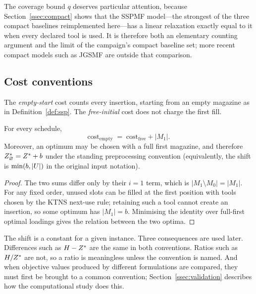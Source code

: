 The coverage bound $q$ deserves particular attention, because
Section~\ref{ssec:compact} shows that the SSPMF model---the strongest of the three
compact baselines reimplemented here---has a linear relaxation exactly equal to it
when every declared tool is used. It is therefore both an elementary counting
argument and the limit of the campaign's compact baseline set; more recent compact
models such as JGSMF \citep{Akhundov2024} are outside that comparison.

\subsection{Cost conventions}\label{ssec:conv}

\begin{definition}\label{def:conv}
The \emph{empty-start} cost counts every insertion, starting from an empty magazine
as in Definition~\ref{def:ssp}. The \emph{free-initial} cost does not charge the
first fill.
\end{definition}

\begin{proposition}\label{prop:conv}
For every schedule,
\[
  \text{cost}_{\mathrm{empty}}
  \;=\;\text{cost}_{\mathrm{free}}+\lvert M_1\rvert.
\]
Moreover, an optimum may be chosen with a full first magazine, and therefore
$Z^{\ast}_{\varnothing}=Z^{\ast}+b$ under the standing preprocessing convention (equivalently, the
shift is $\min(b,\lvert U\rvert)$ in the original input notation).
\end{proposition}

\begin{proof}
The two sums differ only by their $i=1$ term, which is
$\lvert M_1\setminus M_0\rvert=\lvert M_1\rvert$. For any fixed order, unused slots
can be filled at the first position with tools chosen by the KTNS next-use rule;
retaining such a tool cannot create an insertion, so some optimum has
$\lvert M_1\rvert=b$. Minimising the identity over full-first optimal loadings gives
the relation between the two optima.
\end{proof}

The shift is a constant for a given instance. Three consequences are used later.
Differences such as $H-Z^{\ast}$ are the same in both conventions. Ratios such as
$H/Z^{\ast}$ are not, so a ratio is meaningless unless the convention is named. And when
objective values produced by different formulations are compared, they must first be
brought to a common convention; Section~\ref{ssec:validation} describes how the
computational study does this.

